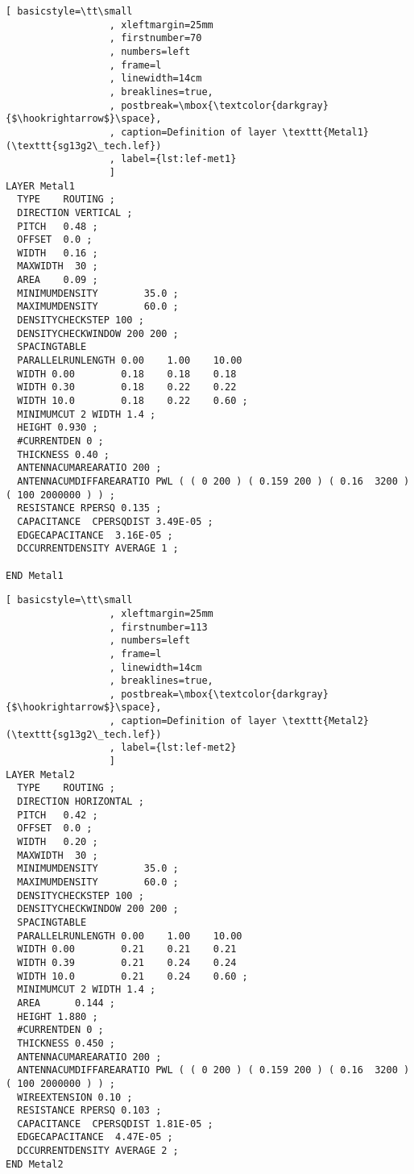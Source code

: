 \documentclass{article}[11pt]
\begin{document}
\begin{lstlisting}[ basicstyle=\tt\small
                  , xleftmargin=25mm
                  , firstnumber=70
                  , numbers=left
                  , frame=l
                  , linewidth=14cm
                  , breaklines=true,
                  , postbreak=\mbox{\textcolor{darkgray}{$\hookrightarrow$}\space},
                  , caption=Definition of layer \texttt{Metal1} (\texttt{sg13g2\_tech.lef})
                  , label={lst:lef-met1}
                  ]
LAYER Metal1
  TYPE    ROUTING ;
  DIRECTION VERTICAL ;
  PITCH   0.48 ;
  OFFSET  0.0 ;
  WIDTH   0.16 ;
  MAXWIDTH  30 ;
  AREA    0.09 ;
  MINIMUMDENSITY        35.0 ;
  MAXIMUMDENSITY        60.0 ;
  DENSITYCHECKSTEP 100 ;
  DENSITYCHECKWINDOW 200 200 ;
  SPACINGTABLE
  PARALLELRUNLENGTH 0.00    1.00    10.00
  WIDTH 0.00        0.18    0.18    0.18
  WIDTH 0.30        0.18    0.22    0.22
  WIDTH 10.0        0.18    0.22    0.60 ;
  MINIMUMCUT 2 WIDTH 1.4 ;
  HEIGHT 0.930 ;
  #CURRENTDEN 0 ;
  THICKNESS 0.40 ;
  ANTENNACUMAREARATIO 200 ;
  ANTENNACUMDIFFAREARATIO PWL ( ( 0 200 ) ( 0.159 200 ) ( 0.16  3200 ) ( 100 2000000 ) ) ;
  RESISTANCE RPERSQ 0.135 ;
  CAPACITANCE  CPERSQDIST 3.49E-05 ;
  EDGECAPACITANCE  3.16E-05 ;
  DCCURRENTDENSITY AVERAGE 1 ;

END Metal1
\end{lstlisting}


\begin{lstlisting}[ basicstyle=\tt\small
                  , xleftmargin=25mm
                  , firstnumber=113
                  , numbers=left
                  , frame=l
                  , linewidth=14cm
                  , breaklines=true,
                  , postbreak=\mbox{\textcolor{darkgray}{$\hookrightarrow$}\space},
                  , caption=Definition of layer \texttt{Metal2} (\texttt{sg13g2\_tech.lef})
                  , label={lst:lef-met2}
                  ]
LAYER Metal2
  TYPE    ROUTING ;
  DIRECTION HORIZONTAL ;
  PITCH   0.42 ;
  OFFSET  0.0 ;
  WIDTH   0.20 ;
  MAXWIDTH  30 ;
  MINIMUMDENSITY        35.0 ;
  MAXIMUMDENSITY        60.0 ;
  DENSITYCHECKSTEP 100 ;
  DENSITYCHECKWINDOW 200 200 ;
  SPACINGTABLE
  PARALLELRUNLENGTH 0.00    1.00    10.00
  WIDTH 0.00        0.21    0.21    0.21
  WIDTH 0.39        0.21    0.24    0.24
  WIDTH 10.0        0.21    0.24    0.60 ;
  MINIMUMCUT 2 WIDTH 1.4 ;
  AREA      0.144 ;
  HEIGHT 1.880 ;
  #CURRENTDEN 0 ;
  THICKNESS 0.450 ;
  ANTENNACUMAREARATIO 200 ;
  ANTENNACUMDIFFAREARATIO PWL ( ( 0 200 ) ( 0.159 200 ) ( 0.16  3200 ) ( 100 2000000 ) ) ;
  WIREEXTENSION 0.10 ;
  RESISTANCE RPERSQ 0.103 ;
  CAPACITANCE  CPERSQDIST 1.81E-05 ;
  EDGECAPACITANCE  4.47E-05 ;
  DCCURRENTDENSITY AVERAGE 2 ;
END Metal2
\end{lstlisting}
\end{document}
